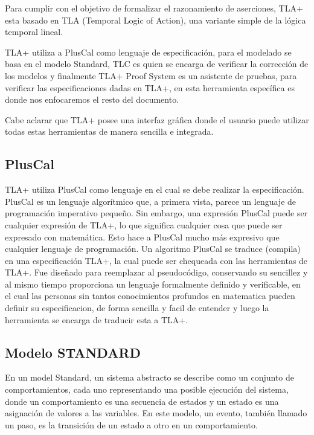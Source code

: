 \documentclass[spanish]{llncs}
\begin{document}
Para cumplir con el objetivo de formalizar el razonamiento de aserciones, TLA+  esta basado en TLA (Temporal Logic of Action), una variante simple de la lógica temporal lineal.

TLA+ utiliza a PlusCal como lenguaje de especificación, para el modelado se basa en el modelo Standard, TLC es quien se encarga de verificar la corrección de los modelos y 
finalmente TLA+ Proof System es un asistente de pruebas, para verificar las especificaciones dadas en TLA+, 
en esta herramienta específica es donde nos enfocaremos el resto del documento. 

Cabe aclarar que TLA+ posee una interfaz gráfica donde el usuario puede utilizar todas estas herramientas de manera sencilla e integrada.

  \subsection{PlusCal}
  TLA+ utiliza PlusCal como lenguaje en el cual se debe realizar la especificación.
  PlusCal es un lenguaje algorítmico que, a primera vista, parece un lenguaje de programación imperativo pequeño. Sin embargo, una expresión PlusCal puede ser cualquier expresión de 
  TLA+, lo que significa cualquier cosa que puede ser expresado con matemática. Esto hace a PlusCal mucho más expresivo que cualquier lenguaje de programación.
  Un algoritmo PlusCal se traduce (compila) en una especificación TLA+, la cual puede ser chequeada con las herramientas de TLA+.
  Fue diseñado para  reemplazar al  pseudocódigo, conservando su sencillez y al mismo tiempo proporciona un lenguaje formalmente definido y verificable, en el cual las personas 
  sin tantos conocimientos profundos en matematica pueden definir su especificacion, de forma sencilla y facil de entender y luego la herramienta se encarga de traducir esta a TLA+.

  \subsection{Modelo STANDARD}
  En un model Standard, un sistema abstracto se describe como un conjunto de comportamientos, cada uno representando una posible ejecución del sistema, donde un comportamiento es 
  una secuencia de estados y un estado es una asignación de valores a las variables.
  En este modelo, un evento, también llamado un paso, es la transición de un estado a otro en un comportamiento.
\end{document}
